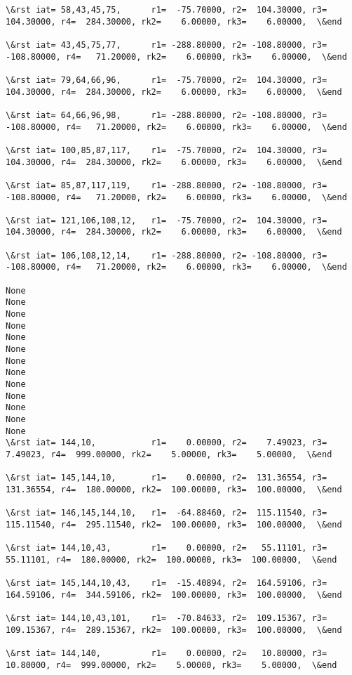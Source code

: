 \documentclass[11pt]{article}
\begin{document}
\begin{Verbatim}[commandchars=\\\{\}]
\&rst iat= 58,43,45,75,      r1=  -75.70000, r2=  104.30000, r3=  104.30000, r4=  284.30000, rk2=    6.00000, rk3=    6.00000,  \&end

\&rst iat= 43,45,75,77,      r1= -288.80000, r2= -108.80000, r3= -108.80000, r4=   71.20000, rk2=    6.00000, rk3=    6.00000,  \&end

\&rst iat= 79,64,66,96,      r1=  -75.70000, r2=  104.30000, r3=  104.30000, r4=  284.30000, rk2=    6.00000, rk3=    6.00000,  \&end

\&rst iat= 64,66,96,98,      r1= -288.80000, r2= -108.80000, r3= -108.80000, r4=   71.20000, rk2=    6.00000, rk3=    6.00000,  \&end

\&rst iat= 100,85,87,117,    r1=  -75.70000, r2=  104.30000, r3=  104.30000, r4=  284.30000, rk2=    6.00000, rk3=    6.00000,  \&end

\&rst iat= 85,87,117,119,    r1= -288.80000, r2= -108.80000, r3= -108.80000, r4=   71.20000, rk2=    6.00000, rk3=    6.00000,  \&end

\&rst iat= 121,106,108,12,   r1=  -75.70000, r2=  104.30000, r3=  104.30000, r4=  284.30000, rk2=    6.00000, rk3=    6.00000,  \&end

\&rst iat= 106,108,12,14,    r1= -288.80000, r2= -108.80000, r3= -108.80000, r4=   71.20000, rk2=    6.00000, rk3=    6.00000,  \&end

None
None
None
None
None
None
None
None
None
None
None
None
None
\&rst iat= 144,10,           r1=    0.00000, r2=    7.49023, r3=    7.49023, r4=  999.00000, rk2=    5.00000, rk3=    5.00000,  \&end

\&rst iat= 145,144,10,       r1=    0.00000, r2=  131.36554, r3=  131.36554, r4=  180.00000, rk2=  100.00000, rk3=  100.00000,  \&end

\&rst iat= 146,145,144,10,   r1=  -64.88460, r2=  115.11540, r3=  115.11540, r4=  295.11540, rk2=  100.00000, rk3=  100.00000,  \&end

\&rst iat= 144,10,43,        r1=    0.00000, r2=   55.11101, r3=   55.11101, r4=  180.00000, rk2=  100.00000, rk3=  100.00000,  \&end

\&rst iat= 145,144,10,43,    r1=  -15.40894, r2=  164.59106, r3=  164.59106, r4=  344.59106, rk2=  100.00000, rk3=  100.00000,  \&end

\&rst iat= 144,10,43,101,    r1=  -70.84633, r2=  109.15367, r3=  109.15367, r4=  289.15367, rk2=  100.00000, rk3=  100.00000,  \&end

\&rst iat= 144,140,          r1=    0.00000, r2=   10.80000, r3=   10.80000, r4=  999.00000, rk2=    5.00000, rk3=    5.00000,  \&end


\end{Verbatim}
\end{document}
